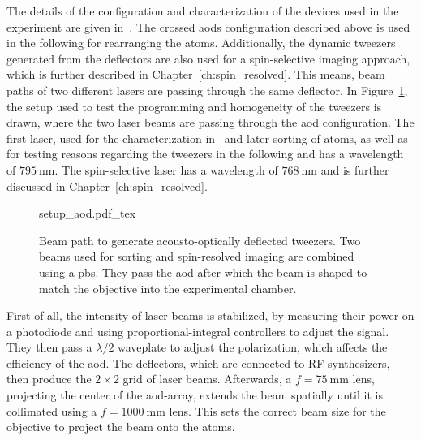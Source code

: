 \begin{figure}[ht]%
\end{figure}

The details of the configuration and characterization of the devices used in the experiment are given in~\cite{Osterholz2020}. The crossed \acp{aod} configuration described above is used in the following for rearranging the atoms. Additionally, the dynamic tweezers generated from the deflectors are also used for a spin-selective imaging approach, which is further described in Chapter~\ref{ch:spin_resolved}. This means, beam paths of two different lasers are passing through the same deflector. In Figure~\ref{fig:setup_aod}, the setup used to test the programming and homogeneity of the tweezers is drawn, where the two laser beams are passing through the \ac{aod} configuration. The first laser, used for the characterization in~\cite{Osterholz2020} and later sorting of atoms, as well as for testing reasons regarding the tweezers in the following and has a wavelength of $\SI{795}{\nano\meter}$. The spin-selective laser has a wavelength of $\SI{768}{\nano\meter}$ and is further discussed in Chapter~\ref{ch:spin_resolved}.

\begin{figure}[t]%
\centering
{setup_aod.pdf_tex}
\caption{Beam path to generate acousto-optically deflected tweezers. Two beams used for sorting and spin-resolved imaging are combined using a \ac{pbs}. They pass the \ac{aod} after which the beam is shaped to match the objective into the experimental chamber.}%
\label{fig:setup_aod}
\end{figure}

First of all, the intensity of laser beams is stabilized, by measuring their power on a photodiode and using proportional-integral controllers to adjust the signal. They then pass a $\lambda/2$ waveplate to adjust the polarization, which affects the efficiency of the \ac{aod}. The deflectors, which are connected to RF-synthesizers, then produce the $2\times2$ grid of laser beams. Afterwards, a $f=\SI{75}{\milli\meter}$ lens, projecting the center of the \ac{aod}-array, extends the beam spatially until it is collimated using a $f=\SI{1000}{\milli\meter}$ lens. This sets the correct beam size for the objective to project the beam onto the atoms.

